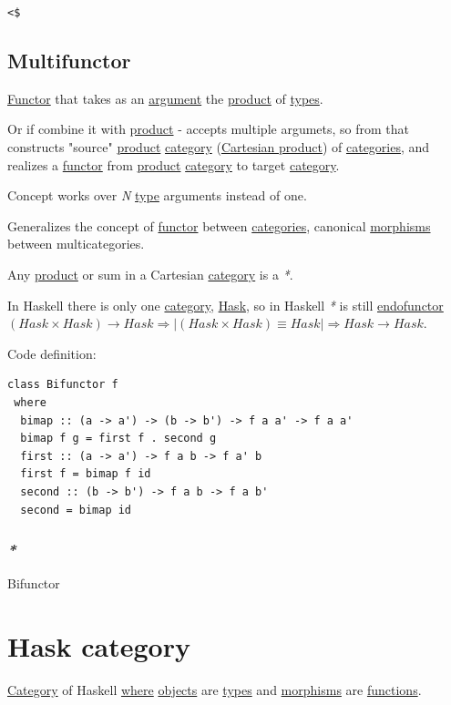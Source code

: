 \documentclass[a4paper,14pt,oneside]{book}
\begin{document}
\texttt{<\$}

\subsection{\label{orgad65629}Multifunctor}
\label{sec:org2fbf666}
\hyperref[orgbabb870]{Functor} that takes as an \hyperref[orgcdc044c]{argument} the \hyperref[orge1daf7e]{product} of \hyperref[org90f7adb]{types}.

Or if combine it with \hyperref[orge1daf7e]{product} - accepts multiple argumets, so from that constructs "source" \hyperref[orge1daf7e]{product} \hyperref[org5b9c164]{category} (\hyperref[org84411f1]{Cartesian product}) of \hyperref[org1a0faa3]{categories}, and realizes a \hyperref[orgbabb870]{functor} from \hyperref[orge1daf7e]{product} \hyperref[org5b9c164]{category} to target \hyperref[org5b9c164]{category}.

Concept works over \emph{N} \hyperref[org99e5c3b]{type} arguments instead of one.

Generalizes the concept of \hyperref[orgbabb870]{functor} between \hyperref[org1a0faa3]{categories}, canonical \hyperref[org6a60338]{morphisms} between multicategories.

Any \hyperref[orge1daf7e]{product} or sum in a Cartesian \hyperref[org5b9c164]{category} is a \emph{*}.

In Haskell there is only one \hyperref[org5b9c164]{category}, \hyperref[org848192b]{Hask}, so in Haskell \emph{*} is still \hyperref[org3cead35]{endofunctor} \((Hask \times Hask) \rightarrow Hask \Rightarrow | (Hask \times Hask) \equiv Hask | \Rightarrow Hask \rightarrow Hask\).

Code definition:
\begin{verbatim}
class Bifunctor f
 where
  bimap :: (a -> a') -> (b -> b') -> f a a' -> f a a'
  bimap f g = first f . second g
  first :: (a -> a') -> f a b -> f a' b
  first f = bimap f id
  second :: (b -> b') -> f a b -> f a b'
  second = bimap id
\end{verbatim}

\subsubsection{\emph{*}}
\label{sec:org64d246d}
\label{org55e2f9c}Bifunctor

\section{\label{orgd1ab817}Hask category}
\label{sec:org2514429}
\hyperref[org5b9c164]{Category} of Haskell \hyperref[orgb660a1e]{where} \hyperref[orge35d5e3]{objects} are \hyperref[org90f7adb]{types} and \hyperref[org6a60338]{morphisms} are \hyperref[org196c7cc]{functions}.
\end{document}
